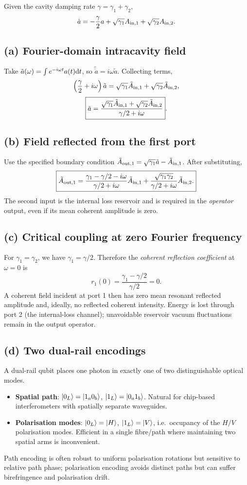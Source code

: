 
Given the cavity damping rate \(\gamma=\gamma_1+\gamma_2\),
\[
\dot a=-\frac{\gamma}{2}a+
\sqrt{\gamma_1}A_{{\rm in},1}
+\sqrt{\gamma_2}A_{{\rm in},2}.
\]
\subsection*{(a) Fourier-domain intracavity field}
Take
\(\tilde a(\omega)=\int e^{-i\omega t}a(t)\mathrm{d} t\),
so \(\widetilde{\dot a}=i\omega\tilde a\).
Collecting terms,
\[
\left(\frac{\gamma}{2}+i\omega\right)\tilde a
=\sqrt{\gamma_1}\tilde A_{{\rm in},1}
+\sqrt{\gamma_2}\tilde A_{{\rm in},2},
\]
\[
\boxed{\tilde a=
\frac{\sqrt{\gamma_1}\tilde A_{{\rm in},1}
+\sqrt{\gamma_2}\tilde A_{{\rm in},2}}
{\gamma/2+i\omega}}.
\]

\subsection*{(b) Field reflected from the first port}
Use the specified boundary condition
\(\tilde A_{{\rm out},1}=
\sqrt{\gamma_1}\tilde a-\tilde A_{{\rm in},1}\).
After substituting,
\[
\boxed{\tilde A_{{\rm out},1}=
\frac{\gamma_1-\gamma/2-i\omega}{\gamma/2+i\omega}
\tilde A_{{\rm in},1}
+\frac{\sqrt{\gamma_1\gamma_2}}{\gamma/2+i\omega}
\tilde A_{{\rm in},2}.}
\]
The second input is the internal loss reservoir and is
required in the \emph{operator} output, even if its
mean coherent amplitude is zero.

\subsection*{(c) Critical coupling at zero Fourier frequency}
For \(\gamma_1=\gamma_2\), we have
\(\gamma_1=\gamma/2\). Therefore the \emph{coherent
reflection coefficient} at \(\omega=0\) is
\[
\boxed{r_1(0)=\frac{\gamma_1-\gamma/2}{\gamma/2}=0}.
\]
A coherent field incident at port 1 then has zero
mean resonant reflected amplitude and, ideally, no
reflected coherent intensity. Energy is lost through
port 2 (the internal-loss channel); unavoidable reservoir
vacuum fluctuations remain in the output operator.

\subsection*{(d) Two dual-rail encodings}
A dual-rail qubit places one photon in exactly one of
two distinguishable optical modes.
\begin{itemize}
\item \textbf{Spatial path}: \(\left\lvert 0_L\right\rangle=\left\lvert 1_a0_b\right\rangle\),
\(\left\lvert 1_L\right\rangle=\left\lvert 0_a1_b\right\rangle\). Natural for chip-based
interferometers with spatially separate waveguides.
\item \textbf{Polarisation modes}: \(\left\lvert 0_L\right\rangle=\left\lvert H\right\rangle\),
\(\left\lvert 1_L\right\rangle=\left\lvert V\right\rangle\), i.e.\ occupancy of the \(H/V\)
polarisation modes. Efficient in a single fibre/path
where maintaining two spatial arms is inconvenient.
\end{itemize}
Path encoding is often robust to uniform polarisation
rotations but sensitive to relative path phase;
polarisation encoding avoids distinct paths but can
suffer birefringence and polarisation drift.

